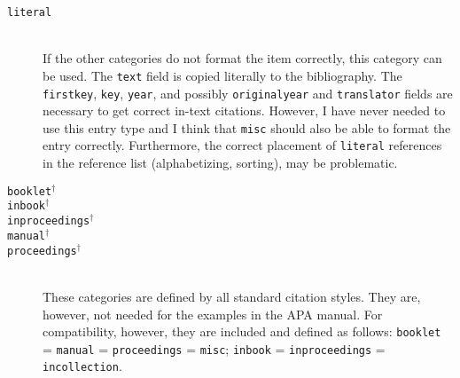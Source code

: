 \documentclass{article}
\newcommand{\LC}{\mbox{${}^{\dag}$}}%
\newcommand{\fieldname}[1]{\texttt{#1}}%
\newcommand{\entryname}[1]{\texttt{#1}}%
\begin{document}
\begin{description}
    \item[\entryname{literal}] \mbox{}\\
        If the other categories do not format the item correctly, this
        category can be used. The \fieldname{text} field is copied literally
        to the bibliography. The \fieldname{firstkey}, \fieldname{key},
        \fieldname{year}, and possibly \fieldname{originalyear} and
        \fieldname{translator} fields are necessary to get correct
        in-text citations. However, I have never needed to use this
        entry type and I think that \entryname{misc} should also
        be able to format the entry correctly. Furthermore, the
        correct placement of \entryname{literal} references in the
        reference list (alphabetizing, sorting), may be problematic.

    \item[\entryname{booklet}\LC]
    \item[\entryname{inbook}\LC]
    \item[\entryname{inproceedings}\LC]
    \item[\entryname{manual}\LC]
    \item[\entryname{proceedings}\LC] \mbox{}\\
        These categories are defined by all standard citation styles. They
        are, however, not needed for the examples in the APA manual. For
        compatibility, however, they are included and defined as follows:
        \entryname{booklet} = \entryname{manual} = \entryname{proceedings} =
        \entryname{misc}; \entryname{inbook} = \entryname{inproceedings} =
        \entryname{incollection}.
\end{description}

\end{document}
